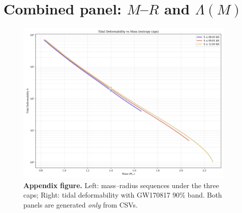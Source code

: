 \documentclass[11pt]{article}
\begin{document}
\appendix
\section{Combined panel: $M$–$R$ and $\Lambda(M)$}
\label{sec:appendix-fig}
\begin{figure}[h!]
\centering
\includegraphics[width=0.95\textwidth]{appendix_fig_a1.png}
\caption{\textbf{Appendix figure.} Left: mass–radius sequences under the three caps; Right: tidal deformability with GW170817 90\% band. Both panels are generated \emph{only} from CSVs.}
\end{figure}
\end{document}
